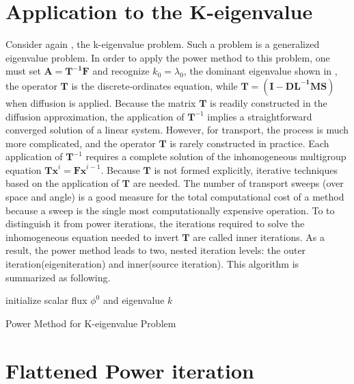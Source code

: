 \section{Application to the K-eigenvalue}

Consider again , the k-eigenvalue problem.
Such a problem is a generalized eigenvalue problem.
In order to apply the power method to this problem, one must set $\mathbf{A=T^{-1}F}$ and recognize $k_0= \lambda_0$, the dominant eigenvalue shown in , the operator $\mathbf{T}$ is the discrete-ordinates equation, while $\mathbf{T} = (\mathbf{I  - DL^{-1}MS})$ when diffusion is applied.
Because the matrix $\mathbf{T}$ is readily constructed in the diffusion approximation, the application of $\mathbf{T}^{-1}$ implies a straightforward converged solution of a linear system. 
However, for transport, the process is much more complicated, and the operator $\mathbf{T}$ is rarely constructed in practice.
Each application of $\mathbf{T}^{-1}$ requires a complete solution of the inhomogeneous multigroup equation $\mathbf{Tx}^{i} = \mathbf{Fx}^{i-1}$.
Because $\mathbf{T}$ is not formed explicitly, iterative techniques based on the application of $\mathbf{T}$ are needed. 
The number of transport sweeps (over space and angle) is a good measure for the total computational cost of a method because a sweep is the single most computationally expensive operation.
To to distinguish it from power iterations, the iterations required to solve the inhomogeneous equation needed to invert $\mathbf{T}$ are called inner iterations.
As a result, the power method leads to two, nested iteration levels: the outer iteration(eigeniteration) and inner(source iteration).
This algorithm is summarized as following.

\begin{algorithm}[H]
\SetAlgoLined
{}
 initialize scalar flux $\phi^{0}$ and eigenvalue $k$ \;
 \caption{Power Method for K-eigenvalue Problem}
\end{algorithm}

\section{Flattened Power iteration}

